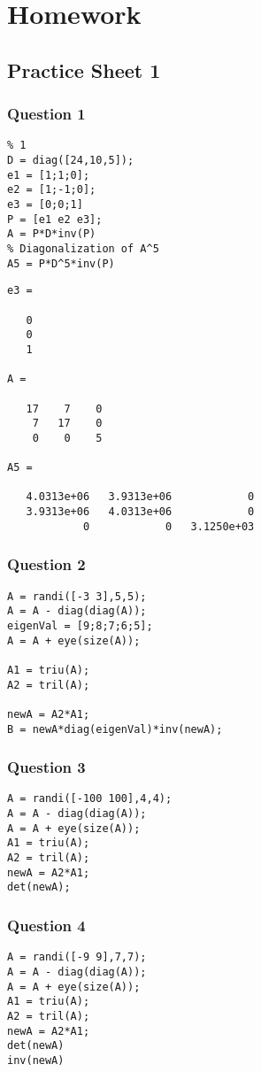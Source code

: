 \documentclass[11pt]{article}
\author{Adithya Nair}
\date{\today}
\title{}
\begin{document}
\tableofcontents

\section{Homework}
\label{sec:org63d834e}
\subsection{Practice Sheet 1}
\label{sec:orgb74fe6e}
\subsubsection{Question 1}
\label{sec:orgc4b7c9a}
\begin{verbatim}
% 1
D = diag([24,10,5]);
e1 = [1;1;0];
e2 = [1;-1;0];
e3 = [0;0;1]
P = [e1 e2 e3];
A = P*D*inv(P)
% Diagonalization of A^5
A5 = P*D^5*inv(P)
\end{verbatim}

\label{}
\begin{verbatim}
e3 =

   0
   0
   1

A =

   17    7    0
    7   17    0
    0    0    5

A5 =

   4.0313e+06   3.9313e+06            0
   3.9313e+06   4.0313e+06            0
            0            0   3.1250e+03

\end{verbatim}
\subsubsection{Question 2}
\label{sec:orgf8e9b95}
\begin{verbatim}
A = randi([-3 3],5,5);
A = A - diag(diag(A));
eigenVal = [9;8;7;6;5];
A = A + eye(size(A));

A1 = triu(A);
A2 = tril(A);

newA = A2*A1;
B = newA*diag(eigenVal)*inv(newA);
\end{verbatim}
\subsubsection{Question 3}
\label{sec:orgb35ec1e}
\begin{verbatim}
A = randi([-100 100],4,4);
A = A - diag(diag(A));
A = A + eye(size(A));
A1 = triu(A);
A2 = tril(A);
newA = A2*A1;
det(newA);
\end{verbatim}
\subsubsection{Question 4}
\label{sec:orgc6b057a}
\begin{verbatim}
A = randi([-9 9],7,7);
A = A - diag(diag(A));
A = A + eye(size(A));
A1 = triu(A);
A2 = tril(A);
newA = A2*A1;
det(newA)
inv(newA)
\end{verbatim}
\end{document}
